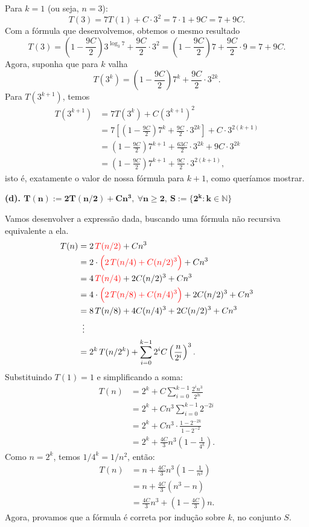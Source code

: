\documentclass[a4paper]{article}
\begin{document}
Para $k=1$ (ou seja, $n=3$):
\[ T(3) = 7T(1) + C\cdot 3^2 = 7\cdot 1 + 9C = 7 + 9C. \]
Com a fórmula que desenvolvemos, obtemos o mesmo resultado
\[ T(3) = \left(1-\frac{9C}{2}\right)3^{\log_3 7} + \frac{9C}{2}\cdot 3^2
= \left(1-\frac{9C}{2}\right)7 + \frac{9C}{2}\cdot 9
= 7 + 9C. \]
Agora, suponha que para $k$ valha
\[ T(3^k) = \left(1-\frac{9C}{2}\right)7^k + \frac{9C}{2}\cdot 3^{2k}. \]
Para $T(3^{k+1})$, temos
\begin{align*}
T(3^{k+1})
&= 7T(3^k) + C(3^{k+1})^2 \\
&= 7\left[\left(1-\frac{9C}{2}\right)7^k + \frac{9C}{2}\cdot 3^{2k}\right] + C\cdot 3^{2(k+1)} \\
&= \left(1-\frac{9C}{2}\right)7^{k+1} + \frac{63C}{2}\cdot 3^{2k} + 9C\cdot 3^{2k} \\
&= \left(1-\frac{9C}{2}\right)7^{k+1} + \frac{9C}{2}\cdot 3^{2(k+1)},
\end{align*}
isto é, exatamente o valor de nossa fórmula para $k+1$, como queríamos mostrar.

\newpage

\textbf{(d). $\bm{T(n) := 2T(n/2) + Cn^3, \: \forall n \ge 2, \: S:= \{ 2^k : k \in \mathbb N \}}$}

Vamos desenvolver a expressão dada, buscando uma fórmula não recursiva equivalente a ela.
\begin{align*}
    T(n) & = 2 \, \color{red} T(n/2) \color{black} + Cn^3 \\
    & = 2 \cdot \color{red} \Big( 2 \, T(n/4) + C(n/2)^3 \Big) \color{black} + Cn^3 \\
    & = 4 \, \color{red} T(n/4) \color{black} + 2C(n/2)^3 + Cn^3 \\
    & = 4 \cdot \color{red} \Big( 2 \, T(n/8) + C(n/4)^3 \Big) \color{black} + 2C(n/2)^3 + Cn^3 \\
    & = 8 \, T(n/8) + 4C(n/4)^3 + 2C(n/2)^3 + Cn^3 \\
    & \: \; \vdots \\
    & = 2^k \, T(n/2^k) + \sum_{i=0}^{k-1} 2^i C\left(\frac{n}{2^i}\right)^3.
\end{align*}
Substituindo $T(1)=1$ e simplificando a soma:
\begin{align*}
    T(n) &= 2^k + C \sum_{i=0}^{k-1} \frac{2^i n^3}{2^{3i}} \\
    &= 2^k + C n^3 \sum_{i=0}^{k-1} 2^{-2i} \\
    &= 2^k + C n^3 \cdot \frac{1 - 2^{-2k}}{1 - 2^{-2}} \\
    &= 2^k + \frac{4C}{3} n^3 \left(1 - \frac{1}{4^k}\right).
\end{align*}
Como $n = 2^k$, temos $1/4^k = 1/n^2$, então:
\begin{align*}
    T(n) &= n + \frac{4C}{3} n^3 \left(1 - \frac{1}{n^2}\right) \\
    &= n + \frac{4C}{3} (n^3 - n) \\
    &= \frac{4C}{3} n^3 + \left(1 - \frac{4C}{3}\right)n.
\end{align*}
Agora, provamos que a fórmula é correta por indução sobre $k$, no conjunto $S$.
\end{document}
